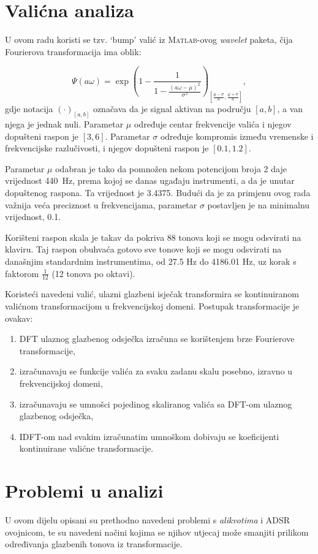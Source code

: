\documentclass[a4paper, 11pt, twocolumn]{article}
\begin{document}
\section{Valićna analiza}
U ovom radu koristi se tzv. `bump' valić iz \textsc{Matlab}-ovog \textit{wavelet} paketa, čija Fourierova transformacija ima oblik\cite{matlab}:

$$ \Psi\left( a \omega \right) = \exp\left( 1 - \frac{1}{1 - \frac{\left(a \omega - \mu \right)^2}{\sigma^2}} \right)_{\left[ \frac{\mu - \sigma}{a}, \frac{\mu + \sigma}{a} \right]}, $$
gdje notacija $(\cdot)_{[a, b]}$ označava da je signal aktivan na području $[a, b]$, a van njega je jednak nuli.
Parametar $\mu$ određuje centar frekvencije valića i njegov dopušteni raspon je $[3, 6]$.
Parametar $\sigma$ određuje kompromis između vremenske i frekvencijske razlučivosti, i njegov dopušteni raspon je $[0.1, 1.2]$.

Parametar $\mu$ odabran je tako da pomnožen nekom potencijom broja 2 daje vrijednost 440\ Hz, prema kojoj se danas ugađaju instrumenti, a da je unutar dopuštenog raspona. Ta vrijednost je 3.4375.
Budući da je za primjenu ovog rada važnija veća preciznost u frekvencijama, parametar $\sigma$ postavljen je na minimalnu vrijednost, 0.1.

Korišteni raspon skala je takav da pokriva 88 tonova koji se mogu odsvirati na klaviru.
Taj raspon obuhvaća gotovo sve tonove koji se mogu odsvirati na današnjim standardnim instrumentima, od 27.5 Hz do 4186.01 Hz, uz korak s faktorom ${\frac{1}{12}}$ (12 tonova po oktavi).

Koristeći navedeni valić, ulazni glazbeni isječak transformira se kontinuiranom valićnom transformacijom u frekvencijskoj domeni.
Postupak transformacije je ovakav:
\begin{enumerate}
  \item DFT ulaznog glazbenog odsječka izračuna se korištenjem brze Fourierove transformacije,
  \item izračunavaju se funkcije valića za svaku zadanu skalu posebno, izravno u frekvencijskoj domeni,
  \item izračunavaju se umnošci pojedinog skaliranog valića sa DFT-om ulaznog glazbenog odsječka,
  \item IDFT-om nad svakim izračunatim umnoškom dobivaju se koeficijenti kontinuirane valićne transformacije.
\end{enumerate}

\section{Problemi u analizi}
U ovom dijelu opisani su prethodno navedeni problemi s \textit{alikvotima} i ADSR ovojnicom, te su navedeni načini kojima se njihov utjecaj može smanjiti prilikom određivanja glazbenih tonova iz transformacije.
\end{document}
